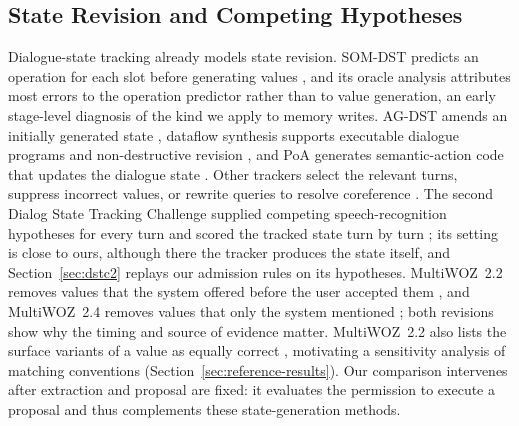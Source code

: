 \documentclass[acmsmall,review]{acmart}
\begin{document}
\subsection{State Revision and Competing Hypotheses}
Dialogue-state tracking already models state revision. SOM-DST predicts an operation for each slot before generating values \cite{cite14}, and its oracle analysis attributes most errors to the operation predictor rather than to value generation, an early stage-level diagnosis of the kind we apply to memory writes. AG-DST amends an initially generated state \cite{cite33}, dataflow synthesis supports executable dialogue programs and non-destructive revision \cite{cite3}, and PoA generates semantic-action code that updates the dialogue state \cite{cite31}. Other trackers select the relevant turns, suppress incorrect values, or rewrite queries to resolve coreference \cite{cite11,cite17,cite34}. The second Dialog State Tracking Challenge supplied competing speech-recognition hypotheses for every turn and scored the tracked state turn by turn \cite{cite12}; its setting is close to ours, although there the tracker produces the state itself, and Section~\ref{sec:dstc2} replays our admission rules on its hypotheses. MultiWOZ~2.2 removes values that the system offered before the user accepted them \cite{cite44}, and MultiWOZ~2.4 removes values that only the system mentioned \cite{cite42}; both revisions show why the timing and source of evidence matter. MultiWOZ~2.2 also lists the surface variants of a value as equally correct \cite{cite44}, motivating a sensitivity analysis of matching conventions (Section~\ref{sec:reference-results}). Our comparison intervenes after extraction and proposal are fixed: it evaluates the permission to execute a proposal and thus complements these state-generation methods.
\end{document}
